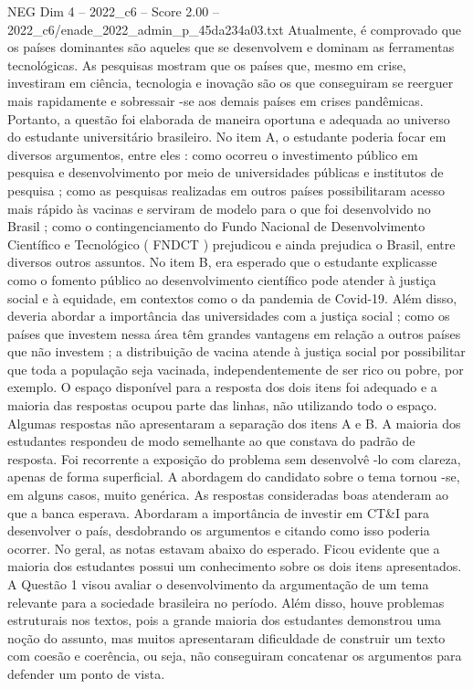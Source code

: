 \begin{textsample}{NEG Dim 4 – 2022\_c6 – Score 2.00 – 2022\_c6/enade\_2022\_admin\_p\_45da234a03.txt}
Atualmente, é comprovado que os países dominantes são aqueles que se desenvolvem e dominam as ferramentas tecnológicas.
As pesquisas mostram que os países que, mesmo em crise, investiram em ciência, tecnologia e inovação são os que conseguiram se reerguer mais rapidamente e sobressair -se aos demais países em crises pandêmicas.
Portanto, a questão foi elaborada de maneira oportuna e adequada ao universo do estudante universitário brasileiro.
No item A, o estudante poderia focar em diversos argumentos, entre eles : como ocorreu o investimento público em pesquisa e desenvolvimento por meio de universidades públicas e institutos de pesquisa ; como as pesquisas realizadas em outros países possibilitaram acesso mais rápido às vacinas e serviram de modelo para o que foi desenvolvido no Brasil ; como o contingenciamento do Fundo Nacional de Desenvolvimento Científico e Tecnológico ( FNDCT ) prejudicou e ainda prejudica o Brasil, entre diversos outros assuntos.
No item B, era esperado que o estudante explicasse como o fomento público ao desenvolvimento científico pode atender à justiça social e à equidade, em contextos como o da pandemia de Covid-19.
Além disso, deveria abordar a importância das universidades com a justiça social ; como os países que investem nessa área têm grandes vantagens em relação a outros países que não investem ; a distribuição de vacina atende à justiça social por possibilitar que toda a população seja vacinada, independentemente de ser rico ou pobre, por exemplo.
O espaço disponível para a resposta dos dois itens foi adequado e a maioria das respostas ocupou parte das linhas, não utilizando todo o espaço.
Algumas respostas não apresentaram a separação dos itens A e B.
A maioria dos estudantes respondeu de modo semelhante ao que constava do padrão de resposta.
Foi recorrente a exposição do problema sem desenvolvê -lo com clareza, apenas de forma superficial.
A abordagem do candidato sobre o tema tornou -se, em alguns casos, muito genérica.
As respostas consideradas boas atenderam ao que a banca esperava.
Abordaram a importância de investir em CT\&I para desenvolver o país, desdobrando os argumentos e citando como isso poderia ocorrer.
No geral, as notas estavam abaixo do esperado.
Ficou evidente que a maioria dos estudantes possui um conhecimento sobre os dois itens apresentados.
A Questão 1 visou avaliar o desenvolvimento da argumentação de um tema relevante para a sociedade brasileira no período.
Além disso, houve problemas estruturais nos textos, pois a grande maioria dos estudantes demonstrou uma noção do assunto, mas muitos apresentaram dificuldade de construir um texto com coesão e coerência, ou seja, não conseguiram concatenar os argumentos para defender um ponto de vista.

\end{textsample}
